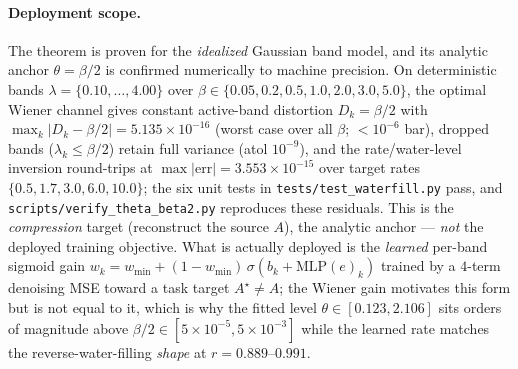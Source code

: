 \paragraph{Deployment scope.}
The theorem is proven for the \emph{idealized} Gaussian band model, and its analytic anchor $\theta=\beta/2$ is confirmed numerically to machine precision. On deterministic bands $\lambda=\{0.10,\dots,4.00\}$ over $\beta\in\{0.05,0.2,0.5,1.0,2.0,3.0,5.0\}$, the optimal Wiener channel gives constant active-band distortion $D_k=\beta/2$ with
$\max_k|D_k-\beta/2|=5.135\times10^{-16}$ (worst case over all $\beta$; $<10^{-6}$ bar), dropped bands ($\lambda_k\le\beta/2$) retain full variance (atol $10^{-9}$), and the rate/water-level inversion round-trips at $\max|\mathrm{err}|=3.553\times10^{-15}$ over target rates $\{0.5,1.7,3.0,6.0,10.0\}$; the six unit tests in \texttt{tests/test\_waterfill.py} pass, and \texttt{scripts/verify\_theta\_beta2.py} reproduces these residuals. This is the \emph{compression} target (reconstruct the source $A$), the analytic anchor --- \emph{not} the deployed training objective. What is actually deployed is the \emph{learned} per-band sigmoid gain $w_k = w_{\min}+(1-w_{\min})\,\sigma(b_k+\mathrm{MLP}(e)_k)$ trained by a $4$-term denoising MSE toward a task target $A^\star\neq A$; the Wiener gain motivates this form but is not equal to it, which is why the fitted level $\theta\in[0.123,2.106]$ sits orders of magnitude above $\beta/2\in[5\times10^{-5},5\times10^{-3}]$ while the learned rate matches the reverse-water-filling \emph{shape} at $r=0.889$--$0.991$.

